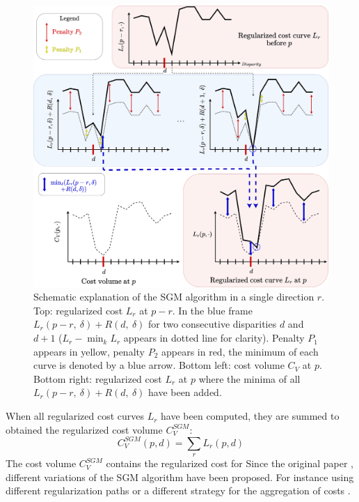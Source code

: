 \begin{figure}
	\centering
	\includegraphics[width=\linewidth]{Images/Chap_1/SGM.png}
	\caption{Schematic explanation of the SGM algorithm in a single direction $r$. Top: regularized cost $L_r$ at $p-r$. In the blue frame $L_r(p-r,~\delta)+R(d,~\delta)$ for two consecutive disparities $d$ and $d+1$ ($L_r-\min_k L_r$ appears in dotted line for clarity). Penalty $P_1$ appears in yellow, penalty $P_2$ appears in red, the minimum of each curve is denoted by a blue arrow. Bottom left: cost volume $C_V$ at $p$. Bottom right: regularized cost $L_r$ at $p$ where the minima of all $L_r(p-r,~\delta)+R(d,~\delta)$ have been added.}
	\label{fig:sgm}
\end{figure}

When all regularized cost curves $L_r$ have been computed, they are summed to obtained the regularized cost volume $C_V^{SGM}$:
\begin{equation}
    C_V^{SGM}(p, d) = \sum_r L_r(p,d)
\end{equation}
The cost volume $C^{SGM}_V$ contains the regularized cost for 
Since the original paper \cite{hirschmuller_accurate_2005}, different variations of the SGM algorithm have been proposed. For instance using different regularization paths \cite{facciolo_mgm_2015} or a different strategy for the aggregation of costs \cite{poggi_learning_2016}.

